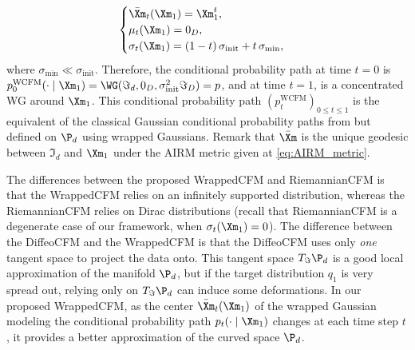 \documentclass[10pt]{article} %
\theoremstyle{plain}
\theoremstyle{definition}
\theoremstyle{remark}
\begin{document}
\begin{equation}
  \label{eq:wcfm_param}
  \begin{cases}
    \bar{\Xm}_t(\Xm_1) = \Xm_1^t, \\
    \mu_t(\Xm_1) = 0_D, \\
    \sigma_t(\Xm_1) = (1-t)\,\sigma_{\text{init}} + t\,\sigma_{\min},
  \end{cases}
\end{equation}
where $\sigma_{\text{min}} \ll \sigma_{\text{init}}$. Therefore, the conditional probability path at time $t = 0$ is $p^{\text{WCFM}}_0(\cdot \mid \Xm_1) = \WG(\Im_d,0_D, \sigma_{\text{init}}^2\Im_D) = p$, and at time $t = 1$, is a concentrated WG around $\Xm_1$. This conditional probability path $(p^{\text{WCFM}}_t)_{0 \leq t \leq 1}$ is the equivalent of the classical Gaussian conditional probability paths  from \citet{lipmanFlowMatchingGenerative2023} but defined on $\P_d$ using wrapped Gaussians. Remark that $\bar{\Xm}$ is the unique geodesic between $\Im_d$ and $\Xm_1$ under the AIRM metric given at \cref{eq:AIRM_metric}.

The differences between the proposed WrappedCFM and RiemannianCFM is that the WrappedCFM relies on an infinitely supported distribution, whereas the RiemannianCFM relies on Dirac distributions (recall that RiemannianCFM is a degenerate case of our framework, when $\sigma_t(\Xm_1) = 0$). The difference between the DiffeoCFM and the WrappedCFM is that the DiffeoCFM uses only \emph{one} tangent space to project the data onto. This tangent space $T_{\Im}\P_d$ is a good local approximation of the manifold $\P_d$, but if the target distribution $q_1$ is very spread out, relying only on $T_{\Im}\P_d$ can induce some deformations. In our proposed WrappedCFM, as the center $\bar{\Xm}_t(\Xm_1)$ of the wrapped Gaussian modeling the conditional probability path $p_t(\cdot \mid \Xm_1)$ changes at each time step $t$, it provides a better approximation of the curved space $\P_d$.
\end{document}
